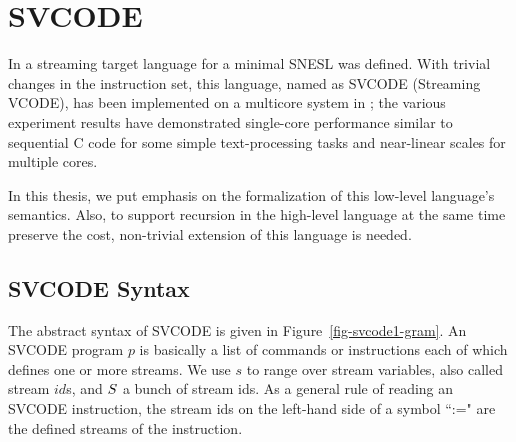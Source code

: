 \section{SVCODE}
In \cite{Fmaster} a streaming target language for a minimal SNESL was defined.
With trivial changes in the instruction set, this language, named as SVCODE (Streaming VCODE), has been implemented on a multicore system in \cite{Fphd}; the various experiment results
have demonstrated single-core performance similar to sequential C code for some simple 
text-processing tasks and near-linear scales for multiple cores.

In this thesis, we put emphasis on the formalization of this low-level language's semantics.
Also, to support recursion in the high-level language at the same time preserve the cost, non-trivial extension of this language is needed. 

\subsection{SVCODE Syntax}
%


The abstract syntax of SVCODE is given in Figure~\ref{fig-svcode1-gram}.
An SVCODE program $p$ is basically a list of commands or instructions each of which defines one or more streams. 
We use $s$ to range over stream variables, also called stream $id$s, and $\S$ a bunch of stream ids.
As a general rule of reading an SVCODE instruction, the stream ids on the left-hand side of a symbol ``:=" are the defined streams of the instruction.


